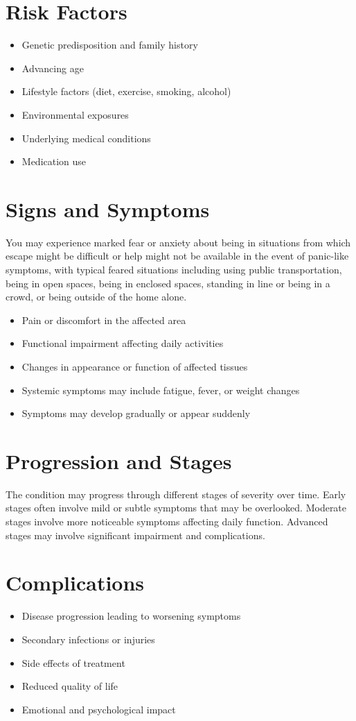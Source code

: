 \section{Risk Factors}
\begin{itemize}[noitemsep]
  \item Genetic predisposition and family history
  \item Advancing age
  \item Lifestyle factors (diet, exercise, smoking, alcohol)
  \item Environmental exposures
  \item Underlying medical conditions
  \item Medication use
\end{itemize}
\section{Signs and Symptoms}
You may experience marked fear or anxiety about being in situations from which escape might be difficult or help might not be available in the event of panic-like symptoms, with typical feared situations including using public transportation, being in open spaces, being in enclosed spaces, standing in line or being in a crowd, or being outside of the home alone.

\begin{itemize}[noitemsep]
  \item Pain or discomfort in the affected area
  \item Functional impairment affecting daily activities
  \item Changes in appearance or function of affected tissues
  \item Systemic symptoms may include fatigue, fever, or weight changes
  \item Symptoms may develop gradually or appear suddenly
\end{itemize}
\section{Progression and Stages}
The condition may progress through different stages of severity over time. Early stages often involve mild or subtle symptoms that may be overlooked. Moderate stages involve more noticeable symptoms affecting daily function. Advanced stages may involve significant impairment and complications.
\section{Complications}
\begin{itemize}[noitemsep]
  \item Disease progression leading to worsening symptoms
  \item Secondary infections or injuries
  \item Side effects of treatment
  \item Reduced quality of life
  \item Emotional and psychological impact
\end{itemize}

